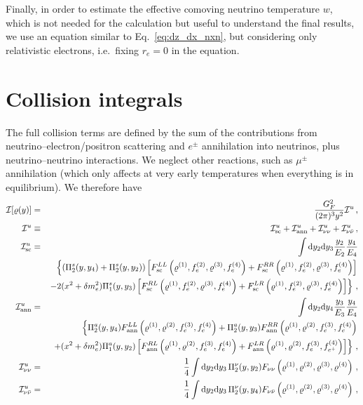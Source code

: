 \documentclass[notitlepage,nofootinbib,showpacs,preprintnumbers,amsmath,amssymb,superscriptaddress,prd,onecolumn]{revtex4-1}
\begin{document}
Finally, in order to estimate the effective comoving neutrino temperature $w$, which is
not needed for the calculation but useful to understand the final results,
we use an equation similar to Eq.~\eqref{eq:dz_dx_nxn},
but considering only relativistic electrons, i.e.\ fixing $r_e=0$ in the equation.


\section{Collision integrals}
\label{sec:collint}
The full collision terms are defined by the sum
of the contributions from neutrino--electron/positron scattering and
$e^\pm$ annihilation into neutrinos,
plus neutrino--neutrino interactions.
We neglect other reactions, such as $\mu^\pm$ annihilation (which only affects at very early temperatures when everything is in equilibrium).
We therefore have \cite{deSalas:2016ztq,Bennett:2020zkv}
%
\begin{eqnarray}
\mathcal{I}[\varrho(y)]
&=&
\frac{G_F^2}{(2\pi)^3y^2}
\mathcal{I}^u\,,
\label{eq:collint}
\\
\mathcal{I}^u
&\equiv&
\mathcal{I}_{\rm sc}^u
+ \mathcal{I}_{\rm ann}^u
+ \mathcal{I}_{\nu\nu}^u
+ \mathcal{I}_{\nu\bar\nu}^u
\,,
\label{eq:unnormcollint}
\\
\mathcal{I}_{\rm sc} ^u
&=&
\int {\rm d}y_2 {\rm d}y_3 \frac{y_2}{E_2} \frac{y_4}{E_4}
\label{eq:I_sc}
\\
&&
\left\{\left(\Pi_2^s(y, y_4)+\Pi_2^s(y, y_2)\right)
    \left[
    F_{\rm sc}^{LL}\left(\varrho^{(1)}, f_e^{(2)}, \varrho^{(3)}, f_e^{(4)}\right)
    +F_{\rm sc}^{RR}\left(\varrho^{(1)}, f_e^{(2)}, \varrho^{(3)}, f_e^{(4)}\right)\right]\right.
    \nonumber\\
    &&\left.-2(x^2+\delta m_e^2)\Pi_1^s(y,y_3)
    \left[
     F_{\rm sc}^{RL}\left(\varrho^{(1)}, f_e^{(2)}, \varrho^{(3)}, f_e^{(4)}\right)
    +F_{\rm sc}^{LR}\left(\varrho^{(1)}, f_e^{(2)}, \varrho^{(3)}, f_e^{(4)}\right)
    \right]\nonumber
\right\}\,,
\\
\mathcal{I}_{\rm ann}^u
&=&
\int {\rm d}y_2 {\rm d}y_4 \frac{y_3}{E_3} \frac{y_4}{E_4}
\label{eq:I_ann}\\
    &&\left\{\Pi_2^a(y, y_4)F_{\rm ann}^{LL}\left(\varrho^{(1)}, \varrho^{(2)}, f_e^{(3)}, f_e^{(4)}\right)
    +\Pi_2^a(y, y_3)F_{\rm ann}^{RR}\left(\varrho^{(1)}, \varrho^{(2)}, f_e^{(3)}, f_e^{(4)}\right)\right.
\nonumber\\
    &&\left.+ (x^2+\delta m_e^2)\Pi_1^a(y,y_2)
    \left[
    F_{\rm ann}^{RL}\left(\varrho^{(1)}, \varrho^{(2)}, f_e^{(3)}, f_e^{(4)}\right)
    +F_{\rm ann}^{LR}\left(\varrho^{(1)}, \varrho^{(2)}, f_e^{(3)}, f_{e^+}^{(4)}\right)
    \right]\nonumber
\right\}\,,
\\
\mathcal{I}_{\nu\nu} ^u
&=&
\frac{1}{4}
\int {\rm d}y_2 {\rm d}y_3\,
\Pi_2^\nu(y, y_2)
F_{\nu\nu}\left(\varrho^{(1)}, \varrho^{(2)}, \varrho^{(3)}, \varrho^{(4)}\right)
\,,
\label{eq:I_nunu}
\\
\mathcal{I}_{\nu\bar\nu} ^u
&=&
\frac{1}{4}
\int {\rm d}y_2 {\rm d}y_3\,
\Pi_2^\nu(y, y_4)
F_{\nu\bar\nu}\left(\varrho^{(1)}, \varrho^{(2)}, \varrho^{(3)}, \varrho^{(4)}\right)
\label{eq:I_nubarnu}
\,,
\end{eqnarray}
\end{document}
